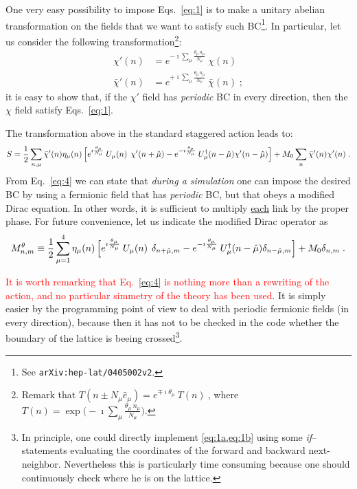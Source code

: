 \documentclass[a4paper,10pt]{article}
\newcommand{\Eq}[1]{Eq.~\eqref{eq:#1}}
\newcommand{\Eqs}[1]{Eqs.~\eqref{eq:#1}}
\begin{document}
One very easy possibility to impose \Eqs{1} is to make a unitary abelian transformation on the fields that
we want to satisfy such BC\footnote{See \texttt{arXiv:hep-lat/0405002v2}.}.
In particular, let us consider the following transformation\footnote{Remark that
$T(n\pm N_\mu\hat{e}_\mu)=e^{\mp\imath\theta_\mu}\:T(n)\:$, where
$T(n)=\exp\bigl(-\imath\sum_\mu\frac{\theta_\mu\:n_\mu}{N_\mu}\bigr)$.}:
\begin{subequations}\label{eq:3}
\begin{align}
 \chi'(n) &=e^{-\imath\sum_\mu\frac{\theta_\mu\:n_\mu}{N_\mu}}\:\chi(n) \\
 \bar\chi'(n) &=e^{+\imath\sum_\mu\frac{\theta_\mu\:n_\mu}{N_\mu}}\:\bar\chi(n)\;;
\end{align}
\end{subequations}
it is easy to show that, if the $\chi'$ field has \emph{periodic} BC in every direction, then the $\chi$
field satisfy \Eqs{1}.

The transformation above in the standard staggered action leads to:
\begin{equation}\label{eq:4}
  S=\frac{1}{2}\sum_{n,\mu}\bar\chi'(n)\eta_\mu(n)\,\Bigl[e^{\imath\frac{\theta_\mu}{N_\mu}}\:
	U_\mu(n)^{\phantom{\dag}}\chi'(n+\hat\mu)-e^{-\imath\frac{\theta_\mu}{N_\mu}}\:
	U^\dag_\mu(n-\hat\mu)\chi'(n-\hat\mu)\Bigr]+M_0\sum_n \bar\chi'(n)\chi'(n)\;.
\end{equation}
From \Eq{4} we can state that \emph{during a simulation} one can impose the desired BC by using a
fermionic field that has \emph{periodic} BC, but that obeys a modified Dirac equation.
In other words, it is sufficient to multiply \underline{each} link by the proper phase.
For future convenience, let us indicate the modified Dirac operator as
\begin{equation*}
 M^\theta_{n,m} \equiv \frac{1}{2}\sum_{\mu=1}^4\eta_\mu(n)\,\Bigl[
                 e^{\imath\frac{\theta_\mu}{N_\mu}}\:U_\mu(n)^{\phantom{\dag}}\delta_{n+\hat\mu,m}
                -e^{-\imath\frac{\theta_\mu}{N_\mu}}\:U^\dag_\mu(n-\hat\mu)\delta_{n-\hat\mu,m}\Bigr]+M_0\delta_{n,m}\;.
\end{equation*}

\textcolor{red}{It is worth remarking that \Eq{4} is nothing more than a rewriting of the
action, and no particular simmetry of the theory has been used.} It is simply easier by
the programming point of view to deal with periodic fermionic fields (in every direction),
because then it has not to be checked in the code whether the boundary of the lattice
is beeing crossed\footnote{In principle, one could directly implement \cref{eq:1a,eq:1b} using
some \emph{if}--statements evaluating the coordinates of the forward and backward next-neighbor.
Nevertheless this is particularly time consuming because one should continuously check where
he is on the lattice.}.
\end{document}
